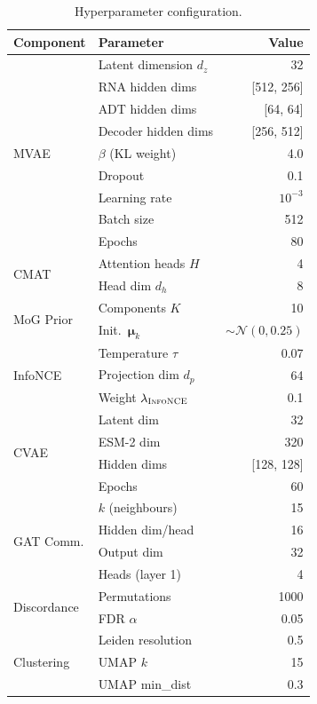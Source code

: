 \documentclass[11pt,a4paper]{article}
\newcommand{\nce}{\textsc{InfoNCE}}
\newcommand{\bmu}{\boldsymbol{\mu}}
\begin{document}
\begin{table}[!ht]
\centering
\caption{Hyperparameter configuration.}
\label{tab:hyperparams}
\scriptsize
\begin{tabular}{llr}
\toprule
\textbf{Component} & \textbf{Parameter} & \textbf{Value} \\
\midrule
\multirow{9}{*}{MVAE} & Latent dimension $d_z$ & 32 \\
  & RNA hidden dims & [512, 256] \\
  & ADT hidden dims & [64, 64] \\
  & Decoder hidden dims & [256, 512] \\
  & $\beta$ (KL weight) & 4.0 \\
  & Dropout & 0.1 \\
  & Learning rate & $10^{-3}$ \\
  & Batch size & 512 \\
  & Epochs & 80 \\
\midrule
\multirow{2}{*}{CMAT} & Attention heads $H$ & 4 \\
  & Head dim $d_h$ & 8 \\
\midrule
\multirow{2}{*}{MoG Prior} & Components $K$ & 10 \\
  & Init.\ $\bmu_k$ & $\sim\mathcal{N}(0,0.25)$ \\
\midrule
\multirow{3}{*}{InfoNCE} & Temperature $\tau$ & 0.07 \\
  & Projection dim $d_p$ & 64 \\
  & Weight $\lambda_\nce$ & 0.1 \\
\midrule
\multirow{4}{*}{CVAE} & Latent dim & 32 \\
  & ESM-2 dim & 320 \\
  & Hidden dims & [128, 128] \\
  & Epochs & 60 \\
\midrule
\multirow{4}{*}{GAT Comm.} & $k$ (neighbours) & 15 \\
  & Hidden dim/head & 16 \\
  & Output dim & 32 \\
  & Heads (layer 1) & 4 \\
\midrule
\multirow{2}{*}{Discordance} & Permutations & 1000 \\
  & FDR $\alpha$ & 0.05 \\
\midrule
\multirow{3}{*}{Clustering} & Leiden resolution & 0.5 \\
  & UMAP $k$ & 15 \\
  & UMAP min\_dist & 0.3 \\
\bottomrule
\end{tabular}
\end{table}
\end{document}
